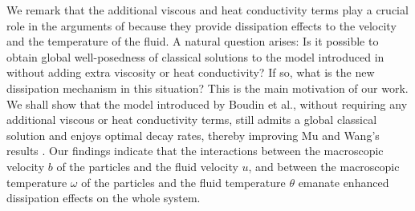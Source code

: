 \documentclass[reqno,11pt]{amsart}
\theoremstyle{plain}
\numberwithin{equation}{section}
\begin{document}
We remark that the   additional    viscous  and  heat conductivity terms  play  a 
crucial role in the arguments of \cite{Mu-Wang-20,LNW-arXiv-2025} because they 
provide dissipation effects to the velocity and the temperature 
of the fluid. A  natural  question  arises: Is it possible to  obtain   global 
well-posedness of classical solutions to the model introduced in  \cite{BBBGLLM-esaim-2009} 
without adding extra viscosity  or  heat conductivity? If so, what is the new dissipation 
mechanism in this situation? 
This is the main motivation of our work. We shall show that  the model  introduced by  
Boudin et al.,  without requiring any additional  
  viscous or heat conductivity terms, still admits a global classical solution and enjoys  
   optimal decay rates, thereby improving  Mu and Wang's results \cite{Mu-Wang-20}. 
   Our findings indicate that the 
  interactions between the macroscopic velocity $b$ of the particles and the fluid 
  velocity $u$, and   between  the macroscopic temperature $\omega$ of the particles and 
  the fluid temperature $\theta$ emanate enhanced dissipation effects on the whole system.
 
  
%

 
\end{document}
